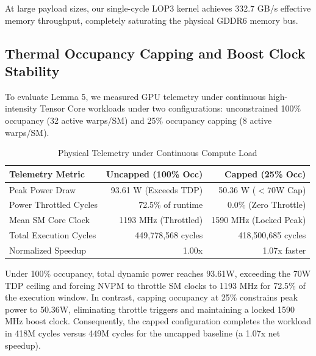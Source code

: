 \documentclass[10pt,twocolumn,letterpaper]{article}
\begin{document}
At large payload sizes, our single-cycle LOP3 kernel achieves 332.7 GB/s effective memory throughput, completely saturating the physical GDDR6 memory bus.

\subsection{Thermal Occupancy Capping and Boost Clock Stability}
To evaluate Lemma 5, we measured GPU telemetry under continuous high-intensity Tensor Core workloads under two configurations: unconstrained 100\% occupancy (32 active warps/SM) and 25\% occupancy capping (8 active warps/SM).

\begin{table}[h]
\centering
\caption{Physical Telemetry under Continuous Compute Load}
\label{tab:telemetry}
\small
\begin{tabular}{lrr}
\toprule
Telemetry Metric & Uncapped (100\% Occ) & Capped (25\% Occ) \\
\midrule
Peak Power Draw        & 93.61 W (Exceeds TDP) & 50.36 W ($< 70$W Cap) \\
Power Throttled Cycles & 72.5\% of runtime     & 0.0\% (Zero Throttle) \\
Mean SM Core Clock     & 1193 MHz (Throttled)  & 1590 MHz (Locked Peak) \\
Total Execution Cycles & 449,778,568 cycles    & 418,500,685 cycles \\
Normalized Speedup     & 1.00x                 & 1.07x faster \\
\bottomrule
\end{tabular}
\end{table}

Under 100\% occupancy, total dynamic power reaches 93.61W, exceeding the 70W TDP ceiling and forcing NVPM to throttle SM clocks to 1193 MHz for 72.5\% of the execution window. In contrast, capping occupancy at 25\% constrains peak power to 50.36W, eliminating throttle triggers and maintaining a locked 1590 MHz boost clock. Consequently, the capped configuration completes the workload in 418M cycles versus 449M cycles for the uncapped baseline (a 1.07x net speedup).
\end{document}
